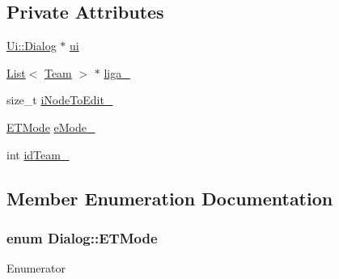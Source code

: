 \subsection*{Private Attributes}
\begin{DoxyCompactItemize}
\item 
\hyperlink{class_ui_1_1_dialog}{Ui\+::\+Dialog} $\ast$ \hyperlink{class_dialog_aaa4b5bfb9a0f64900d524f14bc32e6df}{ui}
\item 
\hyperlink{class_list}{List}$<$ \hyperlink{class_team}{Team} $>$ $\ast$ \hyperlink{class_dialog_a91cdee063ecd915858353d07f2e50eb2}{liga\+\_\+}
\item 
size\+\_\+t \hyperlink{class_dialog_a77bd4ac2499af67029f8f00d682ffde9}{i\+Node\+To\+Edit\+\_\+}
\item 
\hyperlink{class_dialog_ae78164fb050172481b9bc05bdbbdc9b0}{E\+T\+Mode} \hyperlink{class_dialog_a99d3ef596f183ccf2d69c3b465989102}{e\+Mode\+\_\+}
\item 
int \hyperlink{class_dialog_af05db46d671e032a4e51e4068f32fb06}{id\+Team\+\_\+}
\end{DoxyCompactItemize}


\subsection{Member Enumeration Documentation}
\hypertarget{class_dialog_ae78164fb050172481b9bc05bdbbdc9b0}{}
\subsubsection[{E\+T\+Mode}]{\setlength{\rightskip}{0pt plus 5cm}enum {\bf Dialog\+::\+E\+T\+Mode}}\label{class_dialog_ae78164fb050172481b9bc05bdbbdc9b0}
\begin{Desc}
\item[Enumerator]\par
\begin{description}
\item[{\em 
\hypertarget{class_dialog_ae78164fb050172481b9bc05bdbbdc9b0a382169df655aea6ae97508c2cbba7d3e}{}A\+D\+D\label{class_dialog_ae78164fb050172481b9bc05bdbbdc9b0a382169df655aea6ae97508c2cbba7d3e}
}]\item[{\em 
\hypertarget{class_dialog_ae78164fb050172481b9bc05bdbbdc9b0a89d44aa4439f5e2be5a9e99935813385}{}E\+D\+I\+T\label{class_dialog_ae78164fb050172481b9bc05bdbbdc9b0a89d44aa4439f5e2be5a9e99935813385}
}]\item[{\em 
\hypertarget{class_dialog_ae78164fb050172481b9bc05bdbbdc9b0a3ee13ecddf383e1872ad53f5f1947ef1}{}S\+E\+A\+R\+C\+H\label{class_dialog_ae78164fb050172481b9bc05bdbbdc9b0a3ee13ecddf383e1872ad53f5f1947ef1}
}]\end{description}
\end{Desc}


